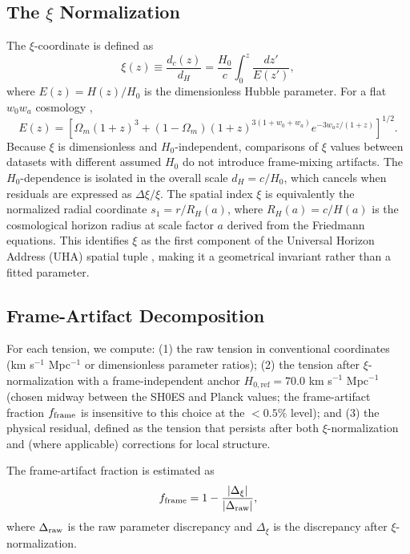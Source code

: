 \documentclass[twocolumn]{aastex631}
\begin{document}
\subsection{The $\xi$ Normalization}

The $\xi$-coordinate is defined as
\begin{equation}
  \xi(z) \equiv \frac{d_c(z)}{d_H} = \frac{H_0}{c} \int_0^z \frac{dz'}{E(z')},
  \label{eq:xi}
\end{equation}
where $E(z) = H(z)/H_0$ is the dimensionless Hubble parameter.
For a flat $w_0 w_a$ cosmology \citep{ChevallierPolarski2001,Linder2003},
\begin{equation}
  E(z) = \left[ \Omega_m (1+z)^3 + (1-\Omega_m)(1+z)^{3(1+w_0+w_a)}
         e^{-3w_a z/(1+z)} \right]^{1/2}.
\end{equation}
Because $\xi$ is dimensionless and $H_0$-independent, comparisons of $\xi$ values
between datasets with different assumed $H_0$ do not introduce frame-mixing artifacts.
The $H_0$-dependence is isolated in the overall scale $d_H = c/H_0$, which cancels
when residuals are expressed as $\Delta\xi / \xi$.
The spatial index $\xi$ is equivalently the normalized radial coordinate
$s_1 = r/R_H(a)$, where $R_H(a) = c/H(a)$ is the cosmological horizon radius
at scale factor $a$ derived from the Friedmann equations.
This identifies $\xi$ as the first component of the Universal Horizon Address
(UHA) spatial tuple \citep{Martin2026a}, making it a geometrical invariant
rather than a fitted parameter.

\subsection{Frame-Artifact Decomposition}

For each tension, we compute:
(1) the raw tension in conventional coordinates (km s$^{-1}$ Mpc$^{-1}$ or
dimensionless parameter ratios);
(2) the tension after $\xi$-normalization with a frame-independent anchor
$H_{0,\mathrm{ref}} = 70.0$ km s$^{-1}$ Mpc$^{-1}$ (chosen midway between
the SH0ES and Planck values; the frame-artifact fraction $f_{\rm frame}$
is insensitive to this choice at the $< 0.5\%$ level);
and (3) the physical residual, defined as the tension that persists after both
$\xi$-normalization and (where applicable) corrections for local structure.

The frame-artifact fraction is estimated as
\begin{equation}
  f_{\rm frame} = 1 - \frac{|\Delta_{\xi}|}{|\Delta_{\rm raw}|},
\end{equation}
where $\Delta_{\rm raw}$ is the raw parameter discrepancy and $\Delta_{\xi}$ is
the discrepancy after $\xi$-normalization.
\end{document}

